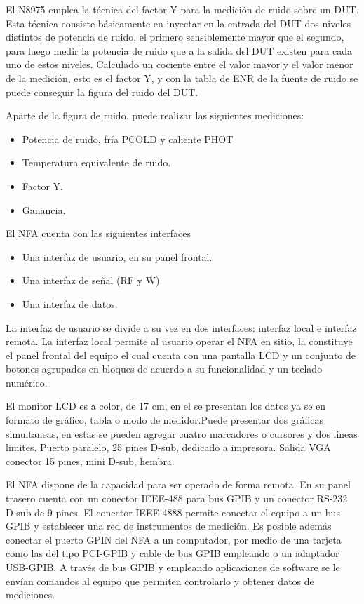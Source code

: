 El N8975 emplea la técnica del factor Y para la medición de ruido sobre un DUT. Esta técnica consiste básicamente en	inyectar en la entrada del DUT dos niveles distintos de potencia de ruido, el primero   sensiblemente mayor que el segundo, para luego medir la potencia de ruido que a la salida del DUT existen para cada uno de estos niveles.	Calculado un cociente entre el valor mayor y el valor menor de la medición, esto es el factor Y, y con la tabla de	ENR de la fuente de ruido se puede conseguir la figura del ruido del DUT.

Aparte de la figura de ruido, puede realizar las siguientes mediciones:

\begin{itemize}
	\item Potencia de ruido, fría PCOLD y caliente PHOT
	\item Temperatura equivalente de ruido.
	\item Factor Y.
	\item Ganancia.
\end{itemize}

El NFA cuenta con las siguientes interfaces

\begin{itemize}
	\item Una interfaz de usuario, en su panel frontal. 
	\item Una interfaz de señal (RF y {}W)
	\item Una interfaz de datos.
\end{itemize}

La interfaz de usuario se divide a su vez en dos interfaces: interfaz local e interfaz remota. La interfaz local permite al usuario operar el NFA en sitio, la constituye el panel frontal del equipo el cual cuenta con una pantalla LCD y un conjunto de botones agrupados en bloques de acuerdo a su funcionalidad y un teclado numérico.

El monitor LCD es a color, de 17 cm, en el se presentan los datos ya se en formato de gráfico, tabla o modo de medidor.Puede presentar dos gráficas simultaneas, en estas se pueden agregar cuatro marcadores o cursores y dos lineas limites. Puerto paralelo, 25 pines D-sub, dedicado a impresora. Salida VGA conector 15 pines, mini D-sub, hembra.

El NFA dispone de la capacidad para ser operado de forma remota. En su panel trasero cuenta con un conector IEEE-488 para bus GPIB y un conector RS-232 D-sub de 9 pines. El conector IEEE-4888 permite conectar el equipo a un bus GPIB y establecer una red de instrumentos de medición. Es posible además conectar el puerto GPIN del NFA a un computador, por medio de una tarjeta como las del tipo PCI-GPIB y cable de bus GPIB empleando o un adaptador USB-GPIB. A través de bus GPIB y empleando aplicaciones de software se le envían comandos al equipo que permiten controlarlo y obtener datos de mediciones.

